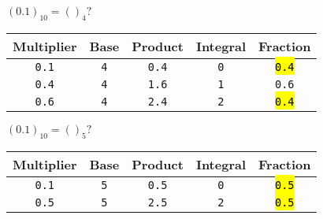 \documentclass[12pt]{article}
\begin{document}
\begin{minipage}[t]{0.5\textwidth}
\begin{center}
	\end{center}
	$(0.1)_{10} = ()_4?$
	\begin{center}
		\begin{tabular}{|c|c|c|c|c|}
			\hline \cellcolor{gray!25}Multiplier &
			\cellcolor{gray!25}Base &
			\cellcolor{gray!25}Product &
			\cellcolor{gray!25}Integral &
			\cellcolor{gray!25}Fraction \\
			\hline\hline
			\texttt{0.1} & \texttt{4} & \texttt{0.4} & \texttt{0} & \hl{\texttt{0.4}} \\\hline
			\texttt{0.4} & \texttt{4} & \texttt{1.6} & \texttt{1} & \texttt{0.6} \\\hline
			\texttt{0.6} & \texttt{4} & \texttt{2.4} & \texttt{2} & \hl{\texttt{0.4}} \\\hline
		\end{tabular}
	\end{center}
	$(0.1)_{10} = ()_5?$
	\begin{center}
		\begin{tabular}{|c|c|c|c|c|}
			\hline \cellcolor{gray!25}Multiplier &
			\cellcolor{gray!25}Base &
			\cellcolor{gray!25}Product &
			\cellcolor{gray!25}Integral &
			\cellcolor{gray!25}Fraction \\
			\hline\hline
			\texttt{0.1} & \texttt{5} & \texttt{0.5} & \texttt{0} & \hl{\texttt{0.5}} \\\hline
			\texttt{0.5} & \texttt{5} & \texttt{2.5} & \texttt{2} & \hl{\texttt{0.5}} \\\hline
		\end{tabular}
	\end{center}
\end{minipage}
\end{document}

